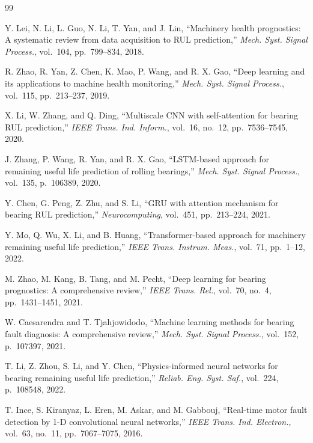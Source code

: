 \documentclass[5p,twocolumn]{elsarticle}
\begin{document}
\begin{thebibliography}{99}

Y. Lei, N. Li, L. Guo, N. Li, T. Yan, and J. Lin,
``Machinery health prognostics: A systematic review from data acquisition to RUL prediction,''
\textit{Mech. Syst. Signal Process.}, vol.~104, pp.~799--834, 2018.

R. Zhao, R. Yan, Z. Chen, K. Mao, P. Wang, and R. X. Gao,
``Deep learning and its applications to machine health monitoring,''
\textit{Mech. Syst. Signal Process.}, vol.~115, pp.~213--237, 2019.

X. Li, W. Zhang, and Q. Ding,
``Multiscale CNN with self-attention for bearing RUL prediction,''
\textit{IEEE Trans. Ind. Inform.}, vol.~16, no.~12, pp.~7536--7545, 2020.

J. Zhang, P. Wang, R. Yan, and R. X. Gao,
``LSTM-based approach for remaining useful life prediction of rolling bearings,''
\textit{Mech. Syst. Signal Process.}, vol.~135, p.~106389, 2020.

Y. Chen, G. Peng, Z. Zhu, and S. Li,
``GRU with attention mechanism for bearing RUL prediction,''
\textit{Neurocomputing}, vol.~451, pp.~213--224, 2021.

Y. Mo, Q. Wu, X. Li, and B. Huang,
``Transformer-based approach for machinery remaining useful life prediction,''
\textit{IEEE Trans. Instrum. Meas.}, vol.~71, pp.~1--12, 2022.

M. Zhao, M. Kang, B. Tang, and M. Pecht,
``Deep learning for bearing prognostics: A comprehensive review,''
\textit{IEEE Trans. Rel.}, vol.~70, no.~4, pp.~1431--1451, 2021.

W. Caesarendra and T. Tjahjowidodo,
``Machine learning methods for bearing fault diagnosis: A comprehensive review,''
\textit{Mech. Syst. Signal Process.}, vol.~152, p.~107397, 2021.

T. Li, Z. Zhou, S. Li, and Y. Chen,
``Physics-informed neural networks for bearing remaining useful life prediction,''
\textit{Reliab. Eng. Syst. Saf.}, vol.~224, p.~108548, 2022.

T. Ince, S. Kiranyaz, L. Eren, M. Askar, and M. Gabbouj,
``Real-time motor fault detection by 1-D convolutional neural networks,''
\textit{IEEE Trans. Ind. Electron.}, vol.~63, no.~11, pp.~7067--7075, 2016.


\end{thebibliography}
\end{document}
